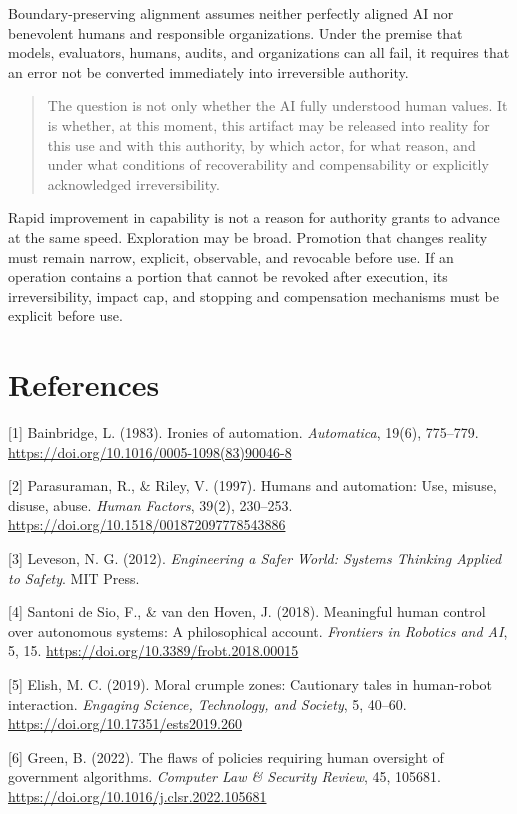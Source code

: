 Boundary-preserving alignment assumes neither perfectly aligned AI nor benevolent humans and responsible organizations. Under the premise that models, evaluators, humans, audits, and organizations can all fail, it requires that an error not be converted immediately into irreversible authority.

\begin{quote}
The question is not only whether the AI fully understood human values. It is whether, at this moment, this artifact may be released into reality for this use and with this authority, by which actor, for what reason, and under what conditions of recoverability and compensability or explicitly acknowledged irreversibility.
\end{quote}

Rapid improvement in capability is not a reason for authority grants to advance at the same speed. Exploration may be broad. Promotion that changes reality must remain narrow, explicit, observable, and revocable before use. If an operation contains a portion that cannot be revoked after execution, its irreversibility, impact cap, and stopping and compensation mechanisms must be explicit before use.

\section{References}\label{references}

{[}1{]} Bainbridge, L. (1983). Ironies of automation. \emph{Automatica}, 19(6), 775--779. \url{https://doi.org/10.1016/0005-1098(83)90046-8}

{[}2{]} Parasuraman, R., \& Riley, V. (1997). Humans and automation: Use, misuse, disuse, abuse. \emph{Human Factors}, 39(2), 230--253. \url{https://doi.org/10.1518/001872097778543886}

{[}3{]} Leveson, N. G. (2012). \emph{Engineering a Safer World: Systems Thinking Applied to Safety}. MIT Press.

{[}4{]} Santoni de Sio, F., \& van den Hoven, J. (2018). Meaningful human control over autonomous systems: A philosophical account. \emph{Frontiers in Robotics and AI}, 5, 15. \url{https://doi.org/10.3389/frobt.2018.00015}

{[}5{]} Elish, M. C. (2019). Moral crumple zones: Cautionary tales in human-robot interaction. \emph{Engaging Science, Technology, and Society}, 5, 40--60. \url{https://doi.org/10.17351/ests2019.260}

{[}6{]} Green, B. (2022). The flaws of policies requiring human oversight of government algorithms. \emph{Computer Law \& Security Review}, 45, 105681. \url{https://doi.org/10.1016/j.clsr.2022.105681}

